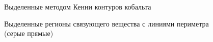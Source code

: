 \documentclass[a4paper, 14pt]{article}
\begin{document}
	\begin{figure}[h]
		\begin{center}
			\begin{minipage}[h]{0.4\linewidth}
				\caption{Выделенные методом Кенни контуров кобальта}
				\label{fig:canny}
			\end{minipage}
			\hfill
			\begin{minipage}[h]{0.5\linewidth}
				\caption{Выделенные регионы связующего вещества с линиями периметра (серые прямые)}
				\label{fig:find_contour}
			\end{minipage}
		\end{center}
	\end{figure}
	
\end{document}
